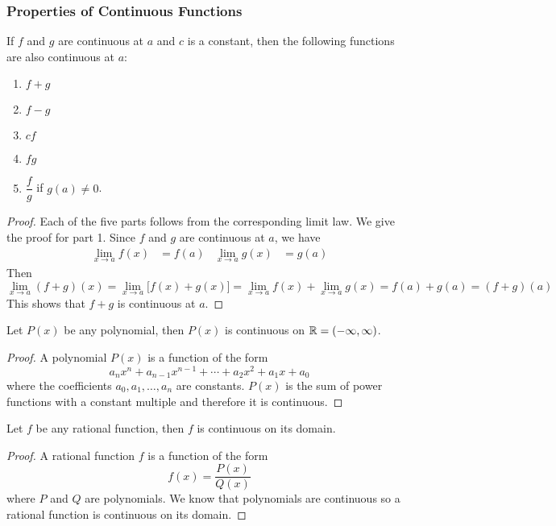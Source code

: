 \subsubsection*{Properties of Continuous Functions}
\begin{theorem}
    If \(f\) and \(g\) are continuous at \(a\) and \(c\) is a constant, then
    the following functions are also continuous at \(a\):
    \begin{enumerate}
        \item \(f+g\)
        \item \(f-g\)
        \item \(cf\)
        \item \(fg\)
        \item \(\dfrac{f}{g}\) if \(g(a)\neq 0\).
    \end{enumerate}
\end{theorem}
\begin{proof}
    Each of the five parts follows from the corresponding limit law.
    We give the proof for part 1.
    Since \(f\) and \(g\) are continuous at \(a\),
    we have
    \begin{align*}
        \lim_{x\to a}f(x) &= f(a) & \lim_{x\to a}g(x) &= g(a)
    \end{align*}
    Then
    \[\lim_{x\to a}(f+g)(x)=\lim_{x\to a}\bigl[f(x)+g(x)\bigr]
    =\lim_{x\to a}f(x)+\lim_{x\to a}g(x)=f(a)+g(a)=(f+g)(a)\]
    This shows that \(f+g\) is continuous at \(a\).
\end{proof}
\begin{theorem}
    Let \(P(x)\) be any polynomial, then \(P(x)\) is continuous on
    \(\mathbb{R}=(-\infty,\infty)\).
\end{theorem}
\begin{proof}
    A polynomial \(P(x)\) is a function of the form
    \[a_nx^n+a_{n-1}x^{n-1}+\dotsb +a_{2}x^{2}+a_1x+a_0\]
    where the coefficients \(a_0,a_1,\dots,a_n\) are constants.
    \(P(x)\) is the sum of power functions with a constant multiple and
    therefore it is continuous.
\end{proof}
\begin{theorem}
    Let \(f\) be any rational function,
    then \(f\) is continuous on its domain.
\end{theorem}
\begin{proof}
    A rational function \(f\) is a function of the form
    \[f(x)=\frac{P(x)}{Q(x)}\] where \(P\) and \(Q\) are polynomials.
    We know that polynomials are continuous so a rational function is
    continuous on its domain.
\end{proof}
